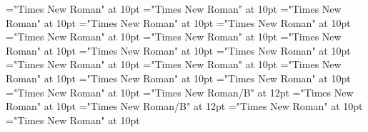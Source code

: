\documentclass[gps1,twoside]{article}
\begin{document}
\font\variantformentrybackrefsminorentryvariantbefore="Times New Roman" at 10pt
\font\variantformentrybackrefsminorentryvariantafter="Times New Roman" at 10pt
\font\variantentrytypevariantentrytypevariantentrytypesvariantformentrybackrefvariantformentrybackrefsminorentryvariantbefore="Times New Roman" at 10pt
\font\variantentrytypesvariantformentrybackrefvariantformentrybackrefsminorentryvariantafter="Times New Roman" at 10pt
\font\reverseabbrvariantentrytypevariantentrytypesvariantformentrybackrefvariantformentrybackrefsminorentryvariantbefore="Times New Roman" at 10pt
\font\spanreverseabbrvariantentrytypevariantentrytypesvariantformentrybackrefvariantformentrybackrefsminorentryvariantlastchildafter="Times New Roman" at 10pt
\font\headwordvariantformentrybackrefvariantformentrybackrefsminorentryvariantbefore="Times New Roman" at 10pt
\font\owningentrysummarydefinitionvariantformentrybackrefvariantformentrybackrefsminorentryvariantbefore="Times New Roman" at 10pt
\font\spanowningentrysummarydefinitionvariantformentrybackrefvariantformentrybackrefsminorentryvariantlastchildafter="Times New Roman" at 10pt
\font\visiblevariantentryrefsminorentryvariantbefore="Times New Roman" at 10pt
\font\visiblevariantentryrefsminorentryvariantafter="Times New Roman" at 10pt
\font\variantentrytypevariantentrytypevariantentrytypesvisiblevariantentryrefvisiblevariantentryrefsminorentryvariantbefore="Times New Roman" at 10pt
\font\variantentrytypesvisiblevariantentryrefvisiblevariantentryrefsminorentryvariantafter="Times New Roman" at 10pt
\font\abbreviationvariantentrytypevariantentrytypesvisiblevariantentryrefvisiblevariantentryrefsminorentryvariantbefore="Times New Roman" at 10pt
\font\spanabbreviationvariantentrytypevariantentrytypesvisiblevariantentryrefvisiblevariantentryrefsminorentryvariantlastchildafter="Times New Roman" at 10pt
\font{}="Times New Roman" at 10pt
\font\spanbzhheadwordreferencedentryreferencedentriesvisiblevariantentryrefvisiblevariantentryrefsminorentryvariant="Times New Roman/B" at 12pt
\font\headwordreferencedentryreferencedentriesvisiblevariantentryrefvisiblevariantentryrefsminorentryvariantbefore="Times New Roman" at 10pt
\font\spanheadwordreferencedentryreferencedentriesvisiblevariantentryrefvisiblevariantentryrefsminorentryvariant="Times New Roman/B" at 12pt
\font{}="Times New Roman" at 10pt
\font\spandefinitionorglossreferencedentryreferencedentriesvisiblevariantentryrefvisiblevariantentryrefsminorentryvariantfirstchildbefore="Times New Roman" at 10pt
\end{document}
